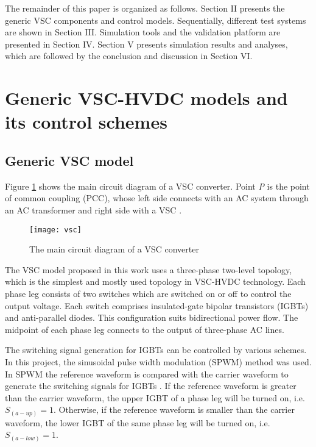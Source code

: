 \documentclass[conference]{IEEEtran}
\begin{document}
The remainder of this paper is organized as follows. Section II presents the generic VSC components and control models. Sequentially, different test systems are shown in Section III. Simulation tools and the validation platform are presented in Section IV. Section V presents simulation results and analyses, which are followed by the conclusion and discussion in Section VI.  
\section{Generic VSC-HVDC models and its control schemes}
\subsection{Generic VSC model\label{sec:VSCmodel}}
Figure \ref{vsc} shows the main circuit diagram of a VSC converter. Point \emph{P} is the point of common coupling (PCC), whose left side connects with an AC system through an AC transformer and right side with a VSC \cite{Zhang}.
\begin{figure}[!ht]
\centering
\texttt{[image: vsc]}
\caption{The main circuit diagram of a VSC converter}
\label{vsc}
\end{figure}

The VSC model proposed in this work uses a three-phase two-level topology, which is the simplest and mostly used topology in VSC-HVDC technology. %
Each phase leg consists of two switches which are switched on or off to control the output voltage. Each switch comprises insulated-gate bipolar transistors (IGBTs) and anti-parallel diodes. This configuration suits bidirectional power flow. The midpoint of each phase leg connects to the output of three-phase AC lines. 

The switching signal generation for IGBTs can be controlled by various schemes. In this project, the sinusoidal pulse width modulation (SPWM) method was used. In SPWM the reference waveform is compared with the carrier waveform to generate the switching signals for IGBTs \cite{Naveed}. If the reference waveform is greater than the carrier waveform, the upper IGBT of a phase leg will be turned on, i.e. $S_{(a-up)}=1$. Otherwise, if the reference waveform is smaller than the carrier waveform, the lower IGBT of the same phase leg will be turned on, i.e. $S_{(a-low)}=1$. 
\end{document}
